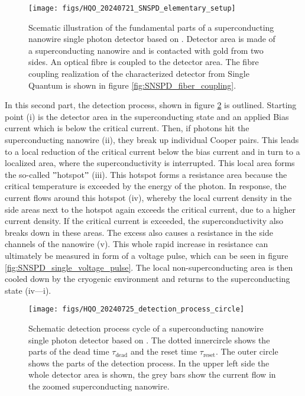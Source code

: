 \begin{figure}[!hbt]
    \centering
    \texttt{[image: figs/HQO\_20240721\_SNSPD\_elementary\_setup]}
    \caption{Scematic illustration of the fundamental parts of a superconducting nanowire single photon detector based on \cite{steudle-2012}.
    Detector area is made of a superconducting nanowire and is contacted with gold from two sides.
    An optical fibre is coupled to the detector area.
    The fibre coupling realization of the characterized detector from Single Quantum is shown in figure \ref{fig:SNSPD_fiber_coupling}.}
    \label{fig:SNSPD_rough_structure}
\end{figure}

\FloatBarrier

In this second part, the detection process, shown in figure \ref{fig: SNSPD_process} is outlined.
Starting point (i) is the detector area in the superconducting state and an applied Bias current which is below the critical current.
Then, if photons hit the superconducting nanowire (ii), they break up individual Cooper pairs.
This leads to a local reduction of the critical current below the bias current and in turn to a localized area, where
the superconductivity is interrupted.
This local area forms the so-called \("\)hotspot\("\) (iii).
This hotspot forms a resistance area because the critical temperature is exceeded by the energy of the photon.
In response, the current flows around this hotspot (iv), whereby the local current density in the side areas next to the
hotspot again exceeds the critical current, due to a higher current density.
If the critical current is exceeded, the superconductivity also breaks down in these areas.
The excess also causes a resistance in the side channels of the nanowire (v).
This whole rapid increase in resistance can ultimately be measured in form of a voltage pulse, which can be seen in figure \ref{fig:SNSPD_single_voltage_pulse}.
The local non-superconducting area is then cooled down by the cryogenic environment and returns to the superconducting state
(iv—i).

\begin{figure}[!hbt]
    \centering
    \texttt{[image: figs/HQO\_20240725\_detection\_process\_circle]}
    \caption{Schematic detection process cycle of a superconducting nanowire single photon detector based on \cite{singlequantum_snsd_nodate}.
    The dotted innercircle shows the parts of the dead time $\tau_{\text{dead}}$ and the reset time $\tau_{\text{reset}}$.
    The outer circle shows the parts of the detection process.
    In the upper left side the whole detector area is shown, the grey bars show the current flow in the zoomed superconducting nanowire.}
    \label{fig: SNSPD_process}
\end{figure}

